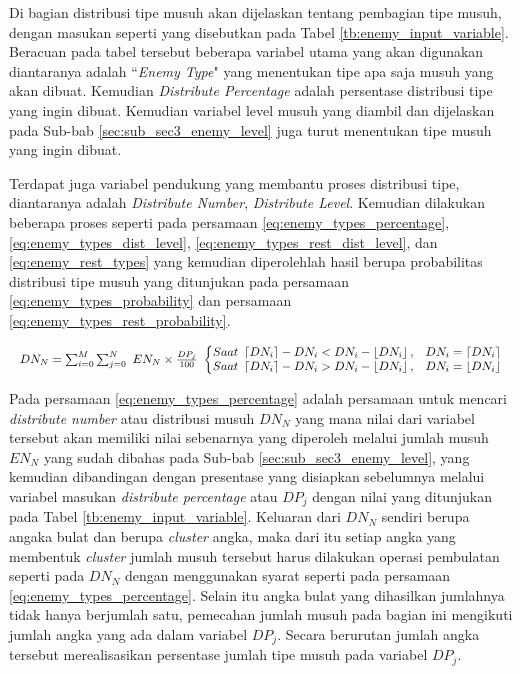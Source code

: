 Di bagian distribusi tipe musuh akan dijelaskan tentang pembagian tipe musuh, dengan masukan seperti yang disebutkan pada Tabel \ref{tb:enemy_input_variable}. Beracuan pada tabel tersebut beberapa variabel utama yang akan digunakan diantaranya adalah ``\textit{Enemy Type}" yang menentukan tipe apa saja musuh yang akan dibuat. Kemudian \textit{Distribute Percentage} adalah persentase distribusi tipe yang ingin dibuat. Kemudian variabel level musuh yang diambil dan dijelaskan pada Sub-bab \ref{sec:sub_sec3_enemy_level} juga turut menentukan tipe musuh yang ingin dibuat.
\vspace{1ex}

Terdapat juga variabel pendukung yang membantu proses distribusi tipe, diantaranya adalah \textit{Distribute Number}, \textit{Distribute Level}. Kemudian dilakukan beberapa proses seperti pada persamaan \ref{eq:enemy_types_percentage}, \ref{eq:enemy_types_dist_level}, \ref{eq:enemy_types_rest_dist_level}, dan \ref{eq:enemy_rest_types} yang kemudian diperolehlah hasil berupa probabilitas distribusi tipe musuh yang ditunjukan pada persamaan \ref{eq:enemy_types_probability} dan persamaan \ref{eq:enemy_types_rest_probability}.
\vspace{1ex}

\begin{equation}\label{eq:enemy_types_percentage}
\begin{split}
	\resizebox{\columnwidth}{!}{%
		$DN_{N} = \sum_{i = 0}^{M} \sum_{j = 0}^{N}\ EN_{N} \times \frac{DP_{j}}{100}\ 
		\left\{\begin{matrix} 
		Saat\ \left \lceil DN_{i} \right \rceil - DN_{i} < DN_{i} - \left \lfloor DN_{i} \right \rfloor, & DN_{i} = \left \lceil DN_{i} \right \rceil \\ 
		Saat\ \left \lceil DN_{i} \right \rceil - DN_{i} > DN_{i} - \left \lfloor DN_{i} \right \rfloor, & DN_{i} = \left \lfloor DN_{i} \right \rfloor
		\end{matrix}\right.$%
	}
\end{split}
\end{equation}

Pada persamaan \ref{eq:enemy_types_percentage} adalah persamaan untuk mencari \textit{distribute number} atau distribusi musuh $DN_{N}$ yang mana nilai dari variabel tersebut akan memiliki nilai sebenarnya yang diperoleh melalui jumlah musuh $EN_{N}$ yang sudah dibahas pada Sub-bab \ref{sec:sub_sec3_enemy_level}, yang kemudian dibandingan dengan presentase yang disiapkan sebelumnya melalui variabel masukan \textit{distribute percentage} atau $DP_{j}$ dengan nilai yang ditunjukan pada Tabel \ref{tb:enemy_input_variable}. Keluaran dari $DN_{N}$ sendiri berupa angaka bulat dan berupa \textit{cluster} angka, maka dari itu setiap angka yang membentuk \textit{cluster} jumlah musuh tersebut harus dilakukan operasi pembulatan seperti pada $DN_{N}$ dengan menggunakan syarat seperti pada persamaan \ref{eq:enemy_types_percentage}. Selain itu angka bulat yang dihasilkan jumlahnya tidak hanya berjumlah satu, pemecahan jumlah musuh pada bagian ini mengikuti jumlah angka yang ada dalam variabel $DP_{j}$. Secara berurutan jumlah angka tersebut merealisasikan persentase jumlah tipe musuh pada variabel $DP_{j}$.
\vspace{1ex}

